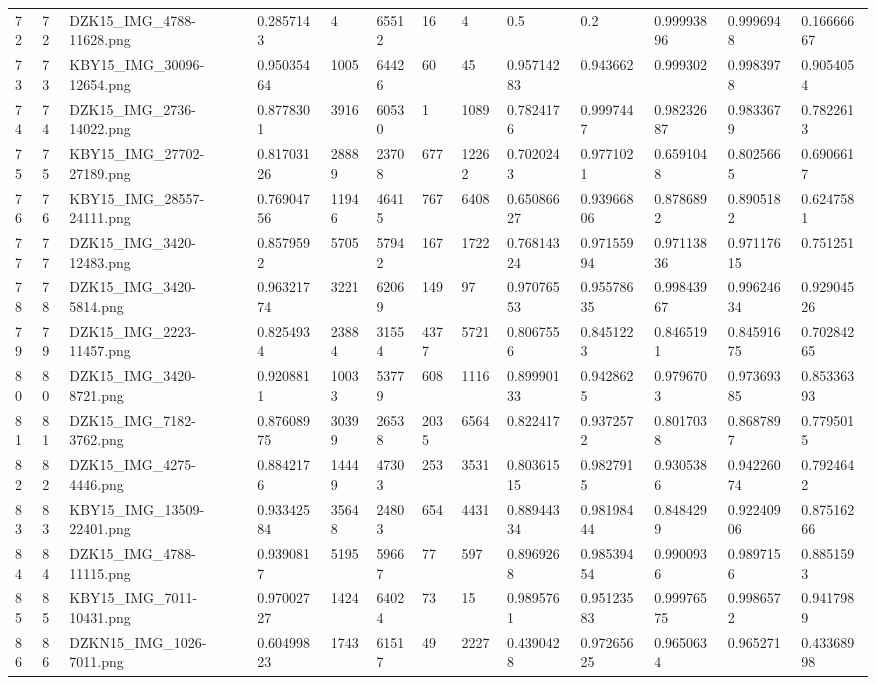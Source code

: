 \documentclass[11pt, a4paper, twoside]{report}
\begin{document}
\begin{longtable}[c]{@{}lllllllllllll@{}}
72 & 72 & DZK15\_IMG\_4788-11628.png & 0.2857143 & 4 & 65512 & 16 & 4 & 0.5 & 0.2 & 0.99993896 & 0.9996948 & 0.16666667 \\
73 & 73 & KBY15\_IMG\_30096-12654.png & 0.95035464 & 1005 & 64426 & 60 & 45 & 0.95714283 & 0.943662 & 0.999302 & 0.9983978 & 0.9054054 \\
74 & 74 & DZK15\_IMG\_2736-14022.png & 0.8778301 & 3916 & 60530 & 1 & 1089 & 0.7824176 & 0.9997447 & 0.98232687 & 0.9833679 & 0.7822613 \\
75 & 75 & KBY15\_IMG\_27702-27189.png & 0.81703126 & 28889 & 23708 & 677 & 12262 & 0.7020243 & 0.9771021 & 0.6591048 & 0.8025665 & 0.6906617 \\
76 & 76 & KBY15\_IMG\_28557-24111.png & 0.76904756 & 11946 & 46415 & 767 & 6408 & 0.65086627 & 0.93966806 & 0.8786892 & 0.8905182 & 0.6247581 \\
77 & 77 & DZK15\_IMG\_3420-12483.png & 0.8579592 & 5705 & 57942 & 167 & 1722 & 0.76814324 & 0.97155994 & 0.97113836 & 0.97117615 & 0.751251 \\
78 & 78 & DZK15\_IMG\_3420-5814.png & 0.96321774 & 3221 & 62069 & 149 & 97 & 0.97076553 & 0.95578635 & 0.99843967 & 0.99624634 & 0.92904526 \\
79 & 79 & DZK15\_IMG\_2223-11457.png & 0.8254934 & 23884 & 31554 & 4377 & 5721 & 0.8067556 & 0.8451223 & 0.8465191 & 0.84591675 & 0.70284265 \\
80 & 80 & DZK15\_IMG\_3420-8721.png & 0.9208811 & 10033 & 53779 & 608 & 1116 & 0.89990133 & 0.9428625 & 0.9796703 & 0.97369385 & 0.85336393 \\
81 & 81 & DZK15\_IMG\_7182-3762.png & 0.87608975 & 30399 & 26538 & 2035 & 6564 & 0.822417 & 0.9372572 & 0.8017038 & 0.8687897 & 0.7795015 \\
82 & 82 & DZK15\_IMG\_4275-4446.png & 0.8842176 & 14449 & 47303 & 253 & 3531 & 0.80361515 & 0.9827915 & 0.9305386 & 0.94226074 & 0.7924642 \\
83 & 83 & KBY15\_IMG\_13509-22401.png & 0.93342584 & 35648 & 24803 & 654 & 4431 & 0.88944334 & 0.98198444 & 0.8484299 & 0.92240906 & 0.87516266 \\
84 & 84 & DZK15\_IMG\_4788-11115.png & 0.9390817 & 5195 & 59667 & 77 & 597 & 0.8969268 & 0.98539454 & 0.9900936 & 0.9897156 & 0.8851593 \\
85 & 85 & KBY15\_IMG\_7011-10431.png & 0.97002727 & 1424 & 64024 & 73 & 15 & 0.9895761 & 0.95123583 & 0.99976575 & 0.9986572 & 0.9417989 \\
86 & 86 & DZKN15\_IMG\_1026-7011.png & 0.60499823 & 1743 & 61517 & 49 & 2227 & 0.4390428 & 0.97265625 & 0.9650634 & 0.965271 & 0.43368998 \\

\end{longtable}
\end{document}
